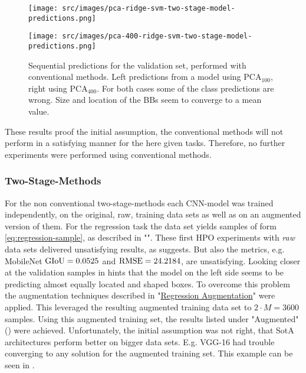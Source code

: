 \begin{figure}[!ht]
    \centering
    \begin{minipage}{.45\textwidth}
    \texttt{[image: src/images/pca-ridge-svm-two-stage-model-predictions.png]}
    \end{minipage}
    \hfill
    \begin{minipage}{.45\textwidth}
    \texttt{[image: src/images/pca-400-ridge-svm-two-stage-model-predictions.png]}
    \end{minipage}
    \caption{Sequential predictions for the validation set, performed with conventional methods. Left predictions from a model using $\text{PCA}_{100}$, right using $\text{PCA}_{400}$. For both cases some of the class predictions are wrong. Size and location of the BBs seem to converge to a mean value.}
    \label{fig:conventional-predictions}
\end{figure}
These results proof the initial assumption, the conventional methods will not perform in a satisfying manner for the here given tasks.
Therefore, no further experiments were performed using conventional methods.
\subsubsection{Two-Stage-Methods}
For the non conventional two-stage-methods each CNN-model was trained independently, on the original, raw, training data sets as well as on an augmented version of them.
For the regression task the data set yields samples of form \eqref{eq:regression-sample}, as described in "".
These first HPO experiments with \textit{raw} data sets delivered unsatisfying results, as  suggests.
But also the metrics, e.g. MobileNet $\text{GIoU} = 0.0525$ and $\text{RMSE}=24.2184$, are unsatisfying.
Looking closer at the validation samples in  hints that the model on the left side seems to be predicting almost equally located and shaped boxes.\newline
To overcome this problem the augmentation techniques described in "\hyperref[subsubsec:regression-augmentation]{Regression Augmentation}" were applied.
This leveraged the resulting augmented training data set to $2 \cdot M = 3600$ samples.
Using this augmented training set, the results listed under "Augmented" () were achieved.
Unfortunately, the initial assumption was not right, that SotA architectures perform better on bigger data sets.
E.g. VGG-16 had trouble converging to any solution for the augmented training set.
This example can be seen in .

